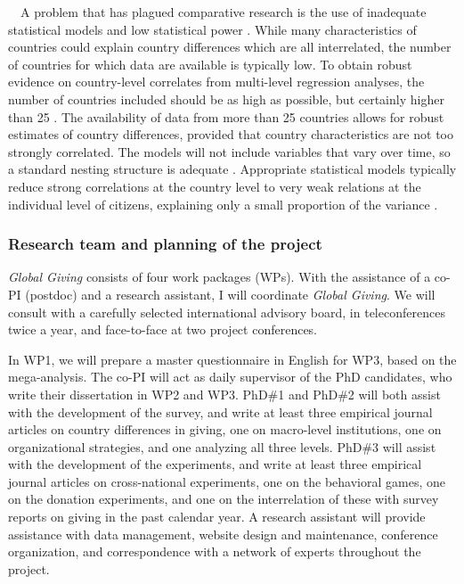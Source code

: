 \documentclass[twocolumn, serif, rga, numeric]{jote-article}
\begin{document}
\ \ A problem that has plagued comparative research is the use of inadequate statistical models and low statistical power \cite{Bekkers2016}.
While many characteristics of countries could explain country differences which are all interrelated, the number of countries for which data are available is typically low. To obtain robust evidence on country-level correlates from multi-level regression analyses, the number of countries included should be as high as possible, but certainly higher than 25 \cite{Bryan2016}. The availability of data from more than 25 countries allows for robust estimates of country differences, provided that country characteristics are not too strongly correlated. The models will not include variables that vary over time, so a standard nesting structure is adequate \cite{Schmidt-Catran2016}.
Appropriate statistical models typically reduce strong correlations at the country level to very weak relations at the individual level of citizens, explaining only a small proportion of the variance \cite{CharitableGivingFoundation2010, Bekkers2016, Gesthuizen2008}.

 {}\subsubsection*{Research team and planning of the project} 

\emph{Global Giving} consists of four work packages (WPs). With the assistance of a co-PI (postdoc) and a research assistant, I will coordinate \emph{Global Giving}. We will consult with a carefully selected international advisory board, in teleconferences twice a year, and face-to-face at two project conferences.

In WP1, we will prepare a master questionnaire in English for WP3, based on the mega-analysis. The co-PI will act as daily supervisor of the PhD candidates, who write their dissertation in WP2 and WP3. PhD\#1 and PhD\#2 will both assist with the development of the survey, and write at least three empirical journal articles on country differences in giving, one on macro-level institutions, one on organizational strategies, and one analyzing all three levels. PhD\#3 will assist with the development of the experiments, and write at least three empirical journal articles on cross-national experiments, one on the behavioral games, one on the donation experiments, and one on the interrelation of these with survey reports on giving in the past calendar year. A research assistant will provide assistance with data management, website design and maintenance, conference organization, and correspondence with a network of experts throughout the project.
\end{document}
